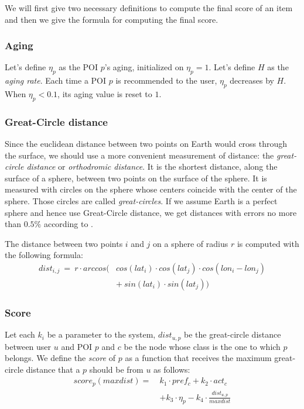 We will first give two necessary definitions to compute the final score of an item and then we give the formula for computing the final score.

\subsubsection{Aging}

Let's define $\eta_p$ as the POI $p$'s aging, initialized on $\eta_p = 1$. Let's define $H$ as the \textit{aging rate}. Each time a POI $p$ is recommended to the user, $\eta_p$ decreases by $H$. When $\eta_p < 0.1$, its aging value is reset to $1$. 

\subsubsection{Great-Circle distance}
Since the euclidean distance between two points on Earth would cross through the surface, we should use a more convenient measurement of distance: the \textit{great-circle distance} or \textit{orthodromic distance}. It is the shortest distance, along the surface of a sphere, between two points on the surface of the sphere. It is measured with circles on the sphere whose centers coincide with the center of the sphere. Those circles are called \textit{great-circles}. If we assume Earth is a perfect sphere and hence use Great-Circle distance, we get distances with errors no more than $0.5\%$ according to \cite{1997admiralty}. 

The distance between two points $i$ and $j$ on a sphere of radius $r$ is computed with the following formula:
\begin{equation} \label{eq:gc-dist}
    \begin{split}
        \scriptstyle{dist_{i,j} \ = \ r \cdot arccos (} & \scriptstyle{cos(lat_i) \cdot cos(lat_j) \cdot cos(lon_i - lon_j)} \\
                                        & \scriptstyle{+ \ sin(lat_i) \cdot sin(lat_j) )}
    \end{split}
\end{equation}

\subsubsection{Score} \label{section:score}
Let each $k_i$ be a parameter to the system, $dist_{u,p}$ be the great-circle distance between user $u$ and POI $p$ and $c$ be the node whose class is the one to which $p$ belongs. We define the \textit{score} of $p$ as a function that receives the maximum great-circle distance that a $p$ should be from $u$ as follows:
\begin{equation} \label{eq:score}
    \begin{split}
        score_p(maxdist) = \ &k_1 \cdot pref_c + k_2 \cdot act_c \\
                                        &+ k_3 \cdot \eta_p - k_4 \cdot \frac{dist_{u,p}}{maxdist}
    \end{split}
\end{equation}